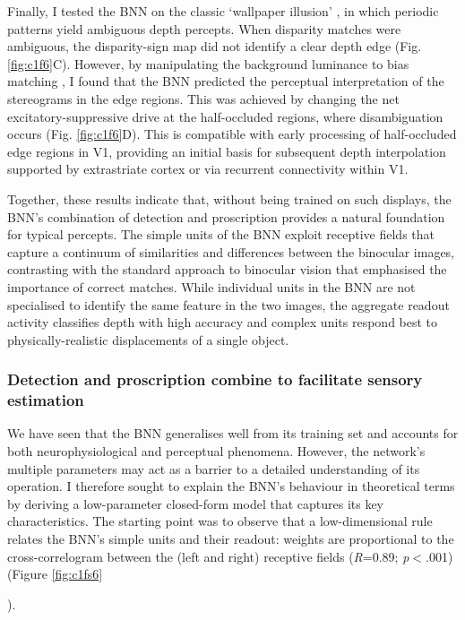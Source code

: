 {Finally, I tested the BNN on the classic `wallpaper illusion' \cite{Brewster:1844jy}, in which periodic patterns yield ambiguous depth percepts. When disparity matches were ambiguous, the disparity-sign map did not identify a clear depth edge (Fig. \ref{fig:c1f6}C). However, by manipulating the background luminance to bias matching \cite{Anderson:1994fk}, I found that the BNN predicted the perceptual interpretation of the stereograms in the edge regions. This was achieved by changing the net excitatory-suppressive drive at the half-occluded regions, where disambiguation occurs (Fig. \ref{fig:c1f6}D). This is compatible with early processing of half-occluded edge regions in V1, providing an initial basis for subsequent depth interpolation supported by extrastriate cortex \cite{Mckee:2007da} or via recurrent connectivity within V1.

Together, these results indicate that, without being trained on such displays, the BNN's combination of detection and proscription provides a natural foundation for typical percepts. The simple units of the BNN exploit receptive fields that capture a continuum of similarities and differences between the binocular images, contrasting with the standard approach to binocular vision that emphasised the importance of correct matches. While individual units in the BNN are not specialised to identify the same feature in the two images, the aggregate readout activity classifies depth with high accuracy and complex units respond best to physically-realistic displacements of a single object.

\subsubsection*{Detection and proscription combine to facilitate sensory estimation}

We have seen that the BNN generalises well from its training set and accounts for both neurophysiological and perceptual phenomena. However, the network's multiple parameters may act as a barrier to a detailed understanding of its operation. I therefore sought to explain the BNN's behaviour in theoretical terms by deriving a low-parameter closed-form model that captures its key characteristics. The starting point was to observe that a low-dimensional rule relates the BNN's simple units and their readout: weights are proportional to the cross-correlogram between the (left and right) receptive fields ({\it R}=0.89; {\it p}$<$.001) (Figure \ref{fig:c1fs6}}). 


